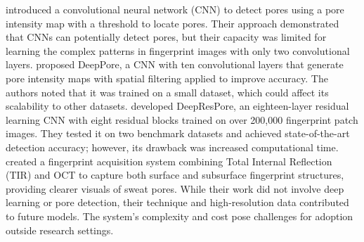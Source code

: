 \textcite{donidalabatiNovelPoreExtraction2018} introduced a convolutional neural network (CNN) to detect pores using a pore intensity map with a threshold to locate pores. Their approach demonstrated that CNNs can potentially detect pores, but their capacity was limited for learning the complex patterns in fingerprint images with only two convolutional layers. \textcite{jangDeepPoreFingerprintPore2017} proposed DeepPore, a CNN with ten convolutional layers that generate pore intensity maps with spatial filtering applied to improve accuracy. The authors noted that it was trained on a small dataset, which could affect its scalability to other datasets. \textcite{anandPoreDetectionHighresolution2019} developed DeepResPore, an eighteen-layer residual learning CNN with eight residual blocks trained on over 200,000 fingerprint patch images. They tested it on two benchmark datasets and achieved state-of-the-art detection accuracy; however, its drawback was increased computational time. \textcite{sunSynchronousFingerprintAcquisition2020} created a fingerprint acquisition system combining Total Internal Reflection (TIR) and OCT to capture both surface and subsurface fingerprint structures, providing clearer visuals of sweat pores. While their work did not involve deep learning or pore detection, their technique and high-resolution data contributed to future models. The system's complexity and cost pose challenges for adoption outside research settings.

